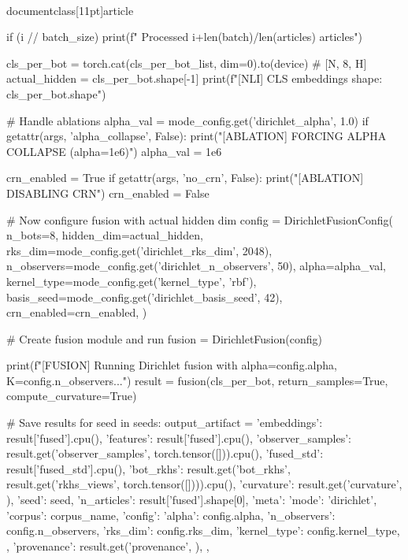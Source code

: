 \\documentclass[11pt]{article}
\begin{document}
\begin{CodeBlock}
        if (i // batch_size) %
            print(f"  Processed {i+len(batch)}/{len(articles)} articles")
    
    cls_per_bot = torch.cat(cls_per_bot_list, dim=0).to(device)  # [N, 8, H]
    actual_hidden = cls_per_bot.shape[-1]
    print(f"[NLI] CLS embeddings shape: {cls_per_bot.shape}")
    

    # Handle ablations
    alpha_val = mode_config.get('dirichlet_alpha', 1.0)
    if getattr(args, 'alpha_collapse', False):
        print("[ABLATION] FORCING ALPHA COLLAPSE (alpha=1e6)")
        alpha_val = 1e6
        
    crn_enabled = True
    if getattr(args, 'no_crn', False):
        print("[ABLATION] DISABLING CRN")
        crn_enabled = False

    # Now configure fusion with actual hidden dim
    config = DirichletFusionConfig(
        n_bots=8,
        hidden_dim=actual_hidden,
        rks_dim=mode_config.get('dirichlet_rks_dim', 2048),
        n_observers=mode_config.get('dirichlet_n_observers', 50),
        alpha=alpha_val,
        kernel_type=mode_config.get('kernel_type', 'rbf'),
        basis_seed=mode_config.get('dirichlet_basis_seed', 42),
        crn_enabled=crn_enabled,
    )
    
    # Create fusion module and run
    fusion = DirichletFusion(config)
    
    print(f"[FUSION] Running Dirichlet fusion with alpha={config.alpha}, K={config.n_observers}...")
    result = fusion(cls_per_bot, return_samples=True, compute_curvature=True)
    
    # Save results
    for seed in seeds:
        output_artifact = {
            'embeddings': result['fused'].cpu(),
            'features': result['fused'].cpu(),
            'observer_samples': result.get('observer_samples', torch.tensor([])).cpu(),
            'fused_std': result['fused_std'].cpu(),
            'bot_rkhs': result.get('bot_rkhs', result.get('rkhs_views', torch.tensor([]))).cpu(),
            'curvature': result.get('curvature', {}),
            'seed': seed,
            'n_articles': result['fused'].shape[0],
            'meta': {
                'mode': 'dirichlet',
                'corpus': corpus_name,
                'config': {
                    'alpha': config.alpha,
                    'n_observers': config.n_observers,
                    'rks_dim': config.rks_dim,
                    'kernel_type': config.kernel_type,
                },
                'provenance': result.get('provenance', {}),
            },
        }
        

\end{CodeBlock}
\end{document}

